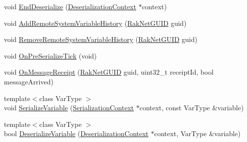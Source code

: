\begin{DoxyCompactItemize}
void \hyperlink{class_rak_net_1_1_variable_delta_serializer_aa004336b73a3e8f2a0ea37526ca06249}{End\-Deserialize} (\hyperlink{struct_rak_net_1_1_variable_delta_serializer_1_1_deserialization_context}{Deserialization\-Context} $\ast$context)
\item 
void \hyperlink{class_rak_net_1_1_variable_delta_serializer_a36242a91f3fd4891d20b804792b60daf}{Add\-Remote\-System\-Variable\-History} (\hyperlink{struct_rak_net_1_1_rak_net_g_u_i_d}{Rak\-Net\-G\-U\-I\-D} guid)
\item 
void \hyperlink{class_rak_net_1_1_variable_delta_serializer_aa11acde48680b36f5312c1729c057a26}{Remove\-Remote\-System\-Variable\-History} (\hyperlink{struct_rak_net_1_1_rak_net_g_u_i_d}{Rak\-Net\-G\-U\-I\-D} guid)
\item 
void \hyperlink{class_rak_net_1_1_variable_delta_serializer_ad82bd595c1111ef536285f401138ebb4}{On\-Pre\-Serialize\-Tick} (void)
\item 
void \hyperlink{class_rak_net_1_1_variable_delta_serializer_a55fc78fe99dae4f7727fa190429ec255}{On\-Message\-Receipt} (\hyperlink{struct_rak_net_1_1_rak_net_g_u_i_d}{Rak\-Net\-G\-U\-I\-D} guid, uint32\-\_\-t receipt\-Id, bool message\-Arrived)
\item 
{\footnotesize template$<$class Var\-Type $>$ }\\void \hyperlink{class_rak_net_1_1_variable_delta_serializer_a1f770773fb03107c9bf6c1acd301a8d6}{Serialize\-Variable} (\hyperlink{struct_rak_net_1_1_variable_delta_serializer_1_1_serialization_context}{Serialization\-Context} $\ast$context, const Var\-Type \&variable)
\item 
{\footnotesize template$<$class Var\-Type $>$ }\\bool \hyperlink{class_rak_net_1_1_variable_delta_serializer_ac7784665aecbdb82c929878c8a5a3007}{Deserialize\-Variable} (\hyperlink{struct_rak_net_1_1_variable_delta_serializer_1_1_deserialization_context}{Deserialization\-Context} $\ast$context, Var\-Type \&variable)
\end{DoxyCompactItemize}
